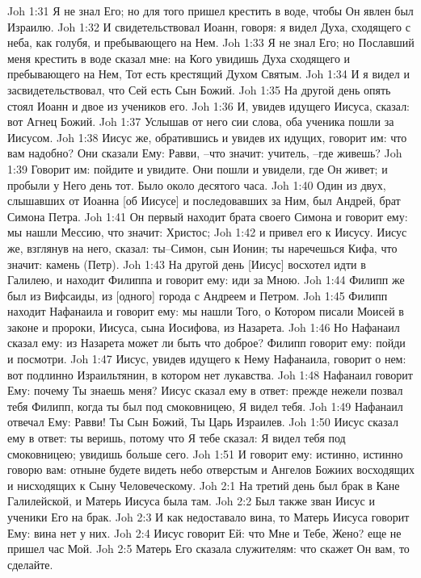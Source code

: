 Joh 1:31  Я не знал Его; но для того пришел крестить в воде, чтобы Он явлен был Израилю.
Joh 1:32  И свидетельствовал Иоанн, говоря: я видел Духа, сходящего с неба, как голубя, и пребывающего на Нем.
Joh 1:33  Я не знал Его; но Пославший меня крестить в воде сказал мне: на Кого увидишь Духа сходящего и пребывающего на Нем, Тот есть крестящий Духом Святым.
Joh 1:34  И я видел и засвидетельствовал, что Сей есть Сын Божий.
Joh 1:35  На другой день опять стоял Иоанн и двое из учеников его.
Joh 1:36  И, увидев идущего Иисуса, сказал: вот Агнец Божий.
Joh 1:37  Услышав от него сии слова, оба ученика пошли за Иисусом.
Joh 1:38  Иисус же, обратившись и увидев их идущих, говорит им: что вам надобно? Они сказали Ему: Равви, --что значит: учитель, --где живешь?
Joh 1:39  Говорит им: пойдите и увидите. Они пошли и увидели, где Он живет; и пробыли у Него день тот. Было около десятого часа.
Joh 1:40  Один из двух, слышавших от Иоанна [об Иисусе] и последовавших за Ним, был Андрей, брат Симона Петра.
Joh 1:41  Он первый находит брата своего Симона и говорит ему: мы нашли Мессию, что значит: Христос;
Joh 1:42  и привел его к Иисусу. Иисус же, взглянув на него, сказал: ты--Симон, сын Ионин; ты наречешься Кифа, что значит: камень (Петр).
Joh 1:43  На другой день [Иисус] восхотел идти в Галилею, и находит Филиппа и говорит ему: иди за Мною.
Joh 1:44  Филипп же был из Вифсаиды, из [одного] города с Андреем и Петром.
Joh 1:45  Филипп находит Нафанаила и говорит ему: мы нашли Того, о Котором писали Моисей в законе и пророки, Иисуса, сына Иосифова, из Назарета.
Joh 1:46  Но Нафанаил сказал ему: из Назарета может ли быть что доброе? Филипп говорит ему: пойди и посмотри.
Joh 1:47  Иисус, увидев идущего к Нему Нафанаила, говорит о нем: вот подлинно Израильтянин, в котором нет лукавства.
Joh 1:48  Нафанаил говорит Ему: почему Ты знаешь меня? Иисус сказал ему в ответ: прежде нежели позвал тебя Филипп, когда ты был под смоковницею, Я видел тебя.
Joh 1:49  Нафанаил отвечал Ему: Равви! Ты Сын Божий, Ты Царь Израилев.
Joh 1:50  Иисус сказал ему в ответ: ты веришь, потому что Я тебе сказал: Я видел тебя под смоковницею; увидишь больше сего.
Joh 1:51  И говорит ему: истинно, истинно говорю вам: отныне будете видеть небо отверстым и Ангелов Божиих восходящих и нисходящих к Сыну Человеческому.
Joh 2:1  На третий день был брак в Кане Галилейской, и Матерь Иисуса была там.
Joh 2:2  Был также зван Иисус и ученики Его на брак.
Joh 2:3  И как недоставало вина, то Матерь Иисуса говорит Ему: вина нет у них.
Joh 2:4  Иисус говорит Ей: что Мне и Тебе, Жено? еще не пришел час Мой.
Joh 2:5  Матерь Его сказала служителям: что скажет Он вам, то сделайте.
